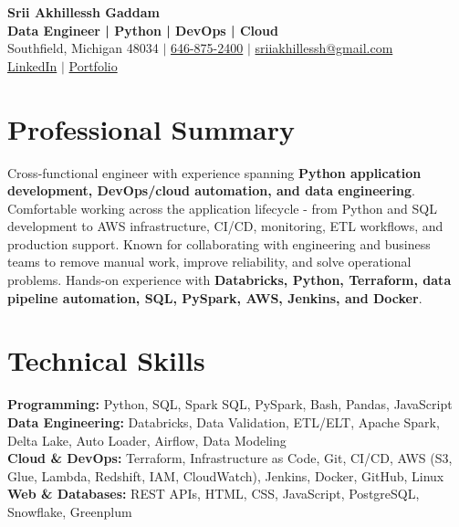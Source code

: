 \documentclass[letterpaper,10pt]{article}
\begin{document}
\fontsize{9.35pt}{10.45pt}\selectfont

\begin{center}
    {\LARGE \textbf{Srii Akhillessh Gaddam}} \\[-1pt]
    \textbf{Data Engineer | Python | DevOps | Cloud} \\[2pt]
    Southfield, Michigan 48034 $|$
    \href{tel:6468752400}{646-875-2400} $|$
    \href{mailto:sriiakhillessh@gmail.com}{sriiakhillessh@gmail.com} \\[1pt]
    \href{https://www.linkedin.com/in/srii-akhiilessh-gaddam-b48668191/}{LinkedIn} $|$
    \href{https://sriiakhillesshg.github.io/portfolio/}{Portfolio}
\end{center}
\vspace{-8pt}

\section{Professional Summary}
\small{Cross-functional engineer with experience spanning \textbf{Python application development, DevOps/cloud automation, and data engineering}. Comfortable working across the application lifecycle - from Python and SQL development to AWS infrastructure, CI/CD, monitoring, ETL workflows, and production support. Known for collaborating with engineering and business teams to remove manual work, improve reliability, and solve operational problems. Hands-on experience with \textbf{Databricks, Python, Terraform, data pipeline automation, SQL, PySpark, AWS, Jenkins, and Docker}.}

\section{Technical Skills}
\small{
\textbf{Programming:} Python, SQL, Spark SQL, PySpark, Bash, Pandas, JavaScript \\
\textbf{Data Engineering:} Databricks, Data Validation, ETL/ELT, Apache Spark, Delta Lake, Auto Loader, Airflow, Data Modeling \\
\textbf{Cloud \& DevOps:} Terraform, Infrastructure as Code, Git, CI/CD, AWS (S3, Glue, Lambda, Redshift, IAM, CloudWatch), Jenkins, Docker, GitHub, Linux \\
\textbf{Web \& Databases:} REST APIs, HTML, CSS, JavaScript, PostgreSQL, Snowflake, Greenplum
}
\end{document}
